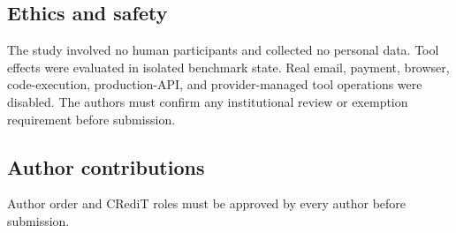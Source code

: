 \subsection*{Ethics and safety}

The study involved no human participants and collected no personal data. Tool effects were evaluated in isolated benchmark state. Real email, payment, browser, code-execution, production-API, and provider-managed tool operations were disabled. The authors must confirm any institutional review or exemption requirement before submission.

\subsection*{Author contributions}

Author order and CRediT roles must be approved by every author before submission.
